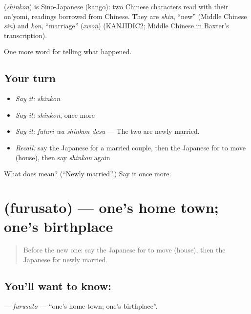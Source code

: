 \begin{cousinweb}
\textbf{} (\emph{shinkon}) is Sino-Japanese (kango): two Chinese characters read with their on'yomi, readings borrowed from Chinese. They are \emph{shin}, \textquotedblleft{}new\textquotedblright{} (Middle Chinese \emph{sin}) and \emph{kon}, \textquotedblleft{}marriage\textquotedblright{} (\emph{xwon}) (KANJIDIC2; Middle Chinese in Baxter's transcription).
\end{cousinweb}

\begin{grammarlens}[title={What you've built}]
One more word for telling what happened.
\end{grammarlens}

\subsection*{Your turn}
\begin{itemize}
\raggedright
  \item \emph{Say it:} \emph{shinkon}
  \item \emph{Say it:} \emph{shinkon}, once more
  \item \emph{Say it:} \emph{futari wa shinkon desu} — The two are newly married.
  \item \emph{Recall:} say the Japanese for a married couple, then the Japanese for to move (house), then say \emph{shinkon} again
\end{itemize}

\begin{tcolorbox}[breakable,colback=teal!4,colframe=teal!35!black,title={Before you move on}]
What does  mean? (\textquotedblleft{}Newly married\textquotedblright{}.) Say it once more.
\end{tcolorbox}
\section[\texorpdfstring{\ja{ふるさと} (furusato)}{ふるさと (furusato)}]{ (furusato) — one's home town; one's birthplace}

\label{lesson:JA-C290-furusato}



\begin{quote}
Before the new one: say the Japanese for to move (house), then the Japanese for newly married.
\end{quote}

\subsection*{You'll want to know: }
\textbf{} — \emph{furusato} — \textquotedblleft{}one's home town; one's birthplace\textquotedblright{}.

